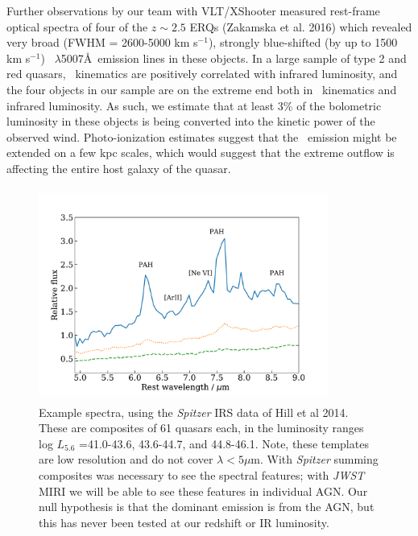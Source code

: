 \smallskip
\smallskip
\noindent
Further observations by our team with VLT/XShooter measured rest-frame
optical spectra of four of the $z\sim 2.5$ ERQs (Zakamska et al. 2016)
which revealed very broad (FWHM = 2600-5000 km s$^{-1}$), strongly
blue-shifted (by up to 1500 km s$^{-1}$) \oiii\ $\lambda$5007\AA\
emission lines in these objects. In a large sample of type 2 and red
quasars, \oiii\ kinematics are positively correlated with infrared
luminosity, and the four objects in our sample are on the extreme end
both in \oiii\ kinematics and infrared luminosity.  As such, we
estimate that at least 3\% of the bolometric luminosity in these
objects is being converted into the kinetic power of the observed
wind. Photo-ionization estimates suggest that the \oiii\ emission
might be extended on a few kpc scales, which would suggest that the
extreme outflow is affecting the entire host galaxy of the quasar.


\begin{figure}
  \centering
    \includegraphics[height=7.0cm,width=9.5cm, trim={32pt 6pt 42pt 12pt},clip]{../Figures/Hill2014_IRspectra_Lrange_v1}
\scriptsize %
\caption{\footnotesize    
Example spectra, using the {\it Spitzer} IRS data of Hill et al
  2014. These are composites of 61 quasars each, in the luminosity
  ranges log $L_{5.6}$ =41.0-43.6, 43.6-44.7, and 44.8-46.1. Note, these
  templates are low resolution and do not cover $\lambda<5\mu$m. With
  {\it Spitzer} summing composites was necessary to see the spectral
  features; with {\it  JWST} MIRI we will be able to see these features in
  individual AGN. Our null hypothesis is that the dominant emission
  is from the AGN, but this has never been tested at our 
  redshift or IR luminosity.}
  \label{fig:eg_spectra}
\end{figure}
\normalsize

